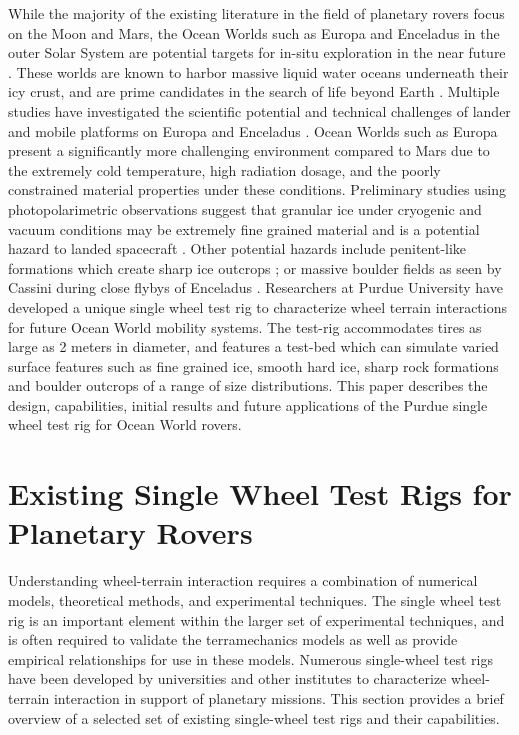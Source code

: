 \documentclass{article}
\begin{document}
While the majority of the existing literature in the field of planetary rovers focus on the Moon and Mars, the Ocean Worlds such as Europa and Enceladus in the outer Solar System are potential targets for in-situ exploration in the near future \cite{sherwood2018program}. These worlds are known to harbor massive liquid water oceans underneath their icy crust, and are prime candidates in the search of life beyond Earth \cite{nimmo2016ocean}. Multiple studies have investigated the scientific potential and technical challenges of lander and mobile platforms on Europa and Enceladus \cite{pappalardo2013science,patthoff2018science,hand2017report,hobley2013rough,nayar2017surface}. Ocean Worlds such as Europa present a significantly more challenging environment compared to Mars due to the extremely cold temperature, high radiation dosage, and the poorly constrained material properties under these conditions. Preliminary studies using photopolarimetric observations suggest that granular ice under cryogenic and vacuum conditions may be extremely fine grained material and is a potential hazard to landed spacecraft \cite{nelson2018laboratory}. Other potential hazards include penitent-like formations which create sharp ice outcrops \cite{hobley2018formation}; or massive boulder fields as seen by Cassini during close flybys of Enceladus \cite{porco2006cassini}. Researchers at Purdue University have developed a unique single wheel test rig to characterize wheel terrain interactions for future Ocean World mobility systems. The test-rig accommodates tires as large as 2 meters in diameter, and features a test-bed which can simulate varied surface features such as fine grained ice, smooth hard ice, sharp rock formations and boulder outcrops of a range of size distributions. This paper describes the design, capabilities, initial results and future applications of the Purdue single wheel test rig for Ocean World rovers. 









\section{Existing Single Wheel Test Rigs for Planetary Rovers}
\label{sec:existing-test-rigs}

Understanding wheel-terrain interaction requires a combination of numerical models, theoretical methods, and experimental techniques. The single wheel test rig is an important element within the larger set of experimental techniques, and is often required to validate the terramechanics models as well as provide empirical relationships for use in these models. Numerous single-wheel test rigs have been developed by universities and other institutes to characterize wheel-terrain interaction in support of planetary missions. This section provides a brief overview of a selected set of existing single-wheel test rigs and their capabilities.
\end{document}
